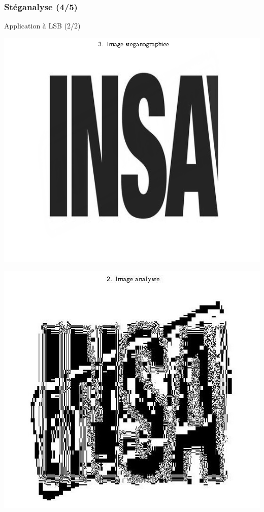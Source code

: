 \documentclass{beamer}
\begin{document}
	\begin{frame}
	\frametitle{Stéganalyse  (4/5)}
	\begin{exampleblock}{Application à LSB (2/2)}
   	\rightskip=0pt\leftskip=0pt
   	\begin{minipage}{.45\textwidth}\centering
		\includegraphics[scale=0.3]{images/fig3.png}
		{\centering{}}
		\label{fig3}
	\end{minipage}
	\begin{minipage}{.45\textwidth}\centering
		\includegraphics[scale=0.25]{images/fig7.png}
		{\centering{}}
		\label{fig8}
	\end{minipage}
	
	\end{exampleblock}
	\end{frame}
\end{document}
